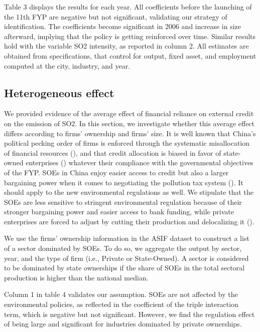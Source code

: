 \documentclass[12pt]{article}
\begin{document}
Table 3 displays the results for each year. All coefficients before the launching of the 11th FYP are negative but not significant, validating our strategy of identification. The coefficients become significant in 2006 and increase in size afterward, implying that the policy is getting reinforced over time. Similar results hold with the variable SO2 intensity, as reported in column 2. All estimates are obtained from specifications, that control for output, fixed asset, and employment computed at the city, industry, and year.

\subsection{Heterogeneous effect}

We provided evidence of the average effect of financial reliance on external credit on the emission of SO2. In this section, we investigate whether this average effect differs according to firms’ ownership and firms’ size. It is well known that China's political pecking order of firms is enforced through the systematic misallocation of financial resources (\cite{Dollar2007-dr}), and that credit allocation is biased in favor of state-owned enterprises (\cite{Huang2003-oa, Brandt2003-hu, Ferri2009-lh, Hale2011-ma}) whatever their compliance with the governmental objectives of the FYP. SOEs in China enjoy easier access to credit but also a larger bargaining power when it comes to negotiating the pollution tax system (\cite{Wang2003-ar, Wang2005-yy}). It should apply to the new environmental regulations as well. We stipulate that the SOEs are less sensitive to stringent environmental regulation because of their stronger bargaining power and easier access to bank funding, while private enterprises are forced to adjust by cutting their production and delocalizing it (\cite{Hering2014-af}).

We use the firms’ ownership information in the ASIF dataset to construct a list of a sector dominated by SOEs. To do so, we aggregate the output by sector, year, and the type of firm (i.e., Private or State-Owned). A sector is considered to be dominated by state ownerships if the share of SOEs in the total sectoral production is higher than the national median. 

Column 1 in table 4 validates our assumption. SOEs are not affected by the environmental policies, as reflected in the coefficient of the triple interaction term, which is negative but not significant. However, we find the regulation effect of being large and significant for industries dominated by private ownerships.
\end{document}
